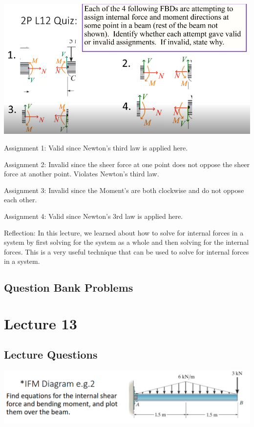 \documentclass{article}[14pt, letterpaper, Times New Roman]
\begin{document}
\includegraphics[width=15cm]{l12-quiz.png}

Assignment 1: Valid since Newton's third law is applied here.

\medskip

Assignment 2: Invalid since the sheer force at one point does not oppose the sheer force at another point.
Violates Newton's third law.

\medskip

Assignment 3: Invalid since the Moment's are both clockwise and do not oppose each other.

\medskip

Assignment 4: Valid since Newton's 3rd law is applied here.

\medskip

Reflection: In this lecture, we learned about how to solve for internal forces in a system by first solving for the system as a whole and then solving for the internal forces. This is a very useful technique that can be used to solve for internal forces in a system.

\subsection{Question Bank Problems}

\section{Lecture 13}

\subsection{Lecture Questions}

\includegraphics[width=15cm]{l13-lq.png}
\end{document}
